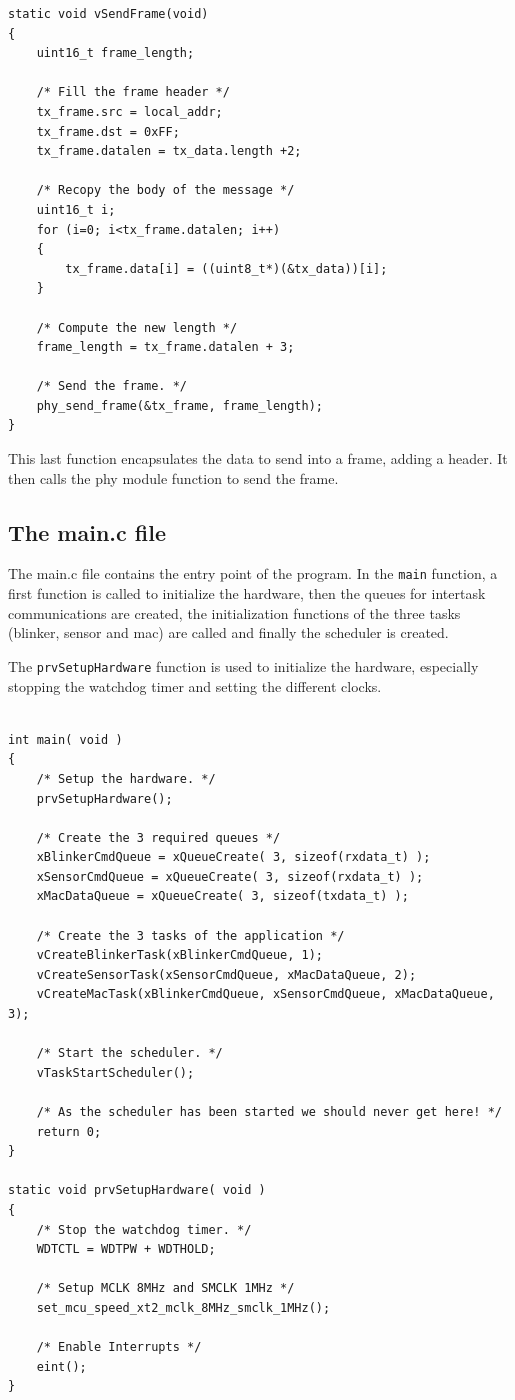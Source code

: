 \documentclass[11pt]{report}
\begin{document}
\begin{verbatim}
static void vSendFrame(void)
{
    uint16_t frame_length;

    /* Fill the frame header */
    tx_frame.src = local_addr;
    tx_frame.dst = 0xFF;
    tx_frame.datalen = tx_data.length +2;

    /* Recopy the body of the message */
    uint16_t i;
    for (i=0; i<tx_frame.datalen; i++)
    {
        tx_frame.data[i] = ((uint8_t*)(&tx_data))[i];
    }

    /* Compute the new length */
    frame_length = tx_frame.datalen + 3;

    /* Send the frame. */
    phy_send_frame(&tx_frame, frame_length);
}
\end{verbatim}
This last function encapsulates the data to send into a frame, adding a header. It then calls the phy module function to send the frame.


\subsection{The main.c file}
The main.c file contains the entry point of the program. In the \verb$main$ function, a first function is called to initialize the hardware, then the queues for intertask communications are created, the initialization functions of the three tasks (blinker, sensor and mac) are called and finally the scheduler is created.

The \verb$prvSetupHardware$ function is used to initialize the hardware, especially stopping the watchdog timer and setting the different clocks.

\begin{verbatim}

int main( void )
{
    /* Setup the hardware. */
    prvSetupHardware();

    /* Create the 3 required queues */
    xBlinkerCmdQueue = xQueueCreate( 3, sizeof(rxdata_t) );
    xSensorCmdQueue = xQueueCreate( 3, sizeof(rxdata_t) );
    xMacDataQueue = xQueueCreate( 3, sizeof(txdata_t) );

    /* Create the 3 tasks of the application */
    vCreateBlinkerTask(xBlinkerCmdQueue, 1);
    vCreateSensorTask(xSensorCmdQueue, xMacDataQueue, 2);
    vCreateMacTask(xBlinkerCmdQueue, xSensorCmdQueue, xMacDataQueue, 3);

    /* Start the scheduler. */
    vTaskStartScheduler();

    /* As the scheduler has been started we should never get here! */
    return 0;
}

static void prvSetupHardware( void )
{
    /* Stop the watchdog timer. */
    WDTCTL = WDTPW + WDTHOLD;

    /* Setup MCLK 8MHz and SMCLK 1MHz */
    set_mcu_speed_xt2_mclk_8MHz_smclk_1MHz();

    /* Enable Interrupts */
    eint();
}

\end{verbatim}
\end{document}
